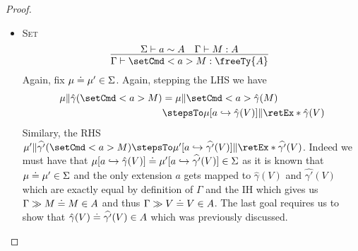 \documentclass[letterpaper]{article}
\begin{document}
\begin{proof}
\begin{itemize}
        \item[] \textsc{Set}
        \[
            \infer[]{\Gamma \vdash \setCmd<a>{M} : \freeTy{A} }{\Sigma \vdash a \sim A & \Gamma \vdash M : A}
        \]
        Again, fix $\mu\mathrel{\doteq}\mu' \in \Sigma$. Again, stepping the LHS we have
        \begin{align*}
            \mu \Vert \hat{\gamma}(\setCmd<a>{M})
            &= \mu \Vert \setCmd<a>{\hat{\gamma}(M)}\\
            &\stepsTo \mu[a \hookrightarrow  \hat{\gamma}(V)] \Vert \retEx*{\hat{\gamma}(V)}
        \end{align*}
        Similary, the RHS $ \mu' \Vert \widehat{\gamma'}(\setCmd<a>{M}) \stepsTo \mu'[a \hookrightarrow  \widehat{\gamma'}(V)] \Vert \retEx*{\widehat{\gamma'}(V)}$. Indeed we must have that $\mu[a \hookrightarrow \hat{\gamma}(V)]\mathrel{\doteq}\mu'[a \hookrightarrow \widehat{\gamma'}(V)] \in \Sigma$ as it is known that $\mu\mathrel{\doteq}\mu' \in \Sigma$ and the only extension $a$ gets mapped to $\hat{\gamma}(V)$ and $\widehat{\gamma'}(V)$ which are exactly equal by definition of $\Gamma$ and the IH which gives us $\Gamma \gg M\mathrel{\doteq}M \in A$ and thus $\Gamma \gg V\mathrel{\doteq}V \in A$. The last goal requires us to show that $\hat{\gamma}(V)\mathrel{\doteq}\widehat{\gamma'}(V) \in A$ which was previously discussed.
    \end{itemize}
\end{proof}
\end{document}
